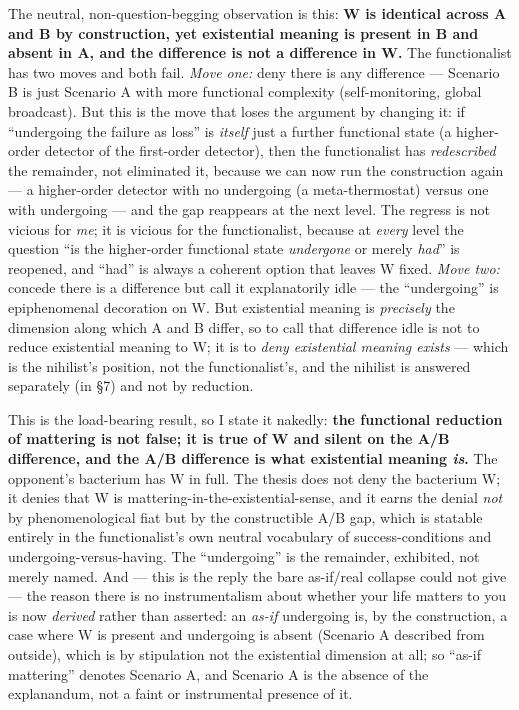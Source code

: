 \documentclass[11pt]{article}
\begin{document}
The neutral, non-question-begging observation is this: \textbf{W is identical across A and B by construction, yet existential meaning is present in B and absent in A, and the difference is not a difference in W.} The functionalist has two moves and both fail. \emph{Move one:} deny there is any difference — Scenario B is just Scenario A with more functional complexity (self-monitoring, global broadcast). But this is the move that loses the argument by changing it: if ``undergoing the failure as loss'' is \emph{itself} just a further functional state (a higher-order detector of the first-order detector), then the functionalist has \emph{redescribed} the remainder, not eliminated it, because we can now run the construction again — a higher-order detector with no undergoing (a meta-thermostat) versus one with undergoing — and the gap reappears at the next level. The regress is not vicious for \emph{me}; it is vicious for the functionalist, because at \emph{every} level the question ``is the higher-order functional state \emph{undergone} or merely \emph{had}'' is reopened, and ``had'' is always a coherent option that leaves W fixed. \emph{Move two:} concede there is a difference but call it explanatorily idle — the ``undergoing'' is epiphenomenal decoration on W. But existential meaning is \emph{precisely} the dimension along which A and B differ, so to call that difference idle is not to reduce existential meaning to W; it is to \emph{deny existential meaning exists} — which is the nihilist's position, not the functionalist's, and the nihilist is answered separately (in §7) and not by reduction.

This is the load-bearing result, so I state it nakedly: \textbf{the functional reduction of mattering is not false; it is true of W and silent on the A/\allowbreak{}B difference, and the A/\allowbreak{}B difference is what existential meaning \emph{is}.} The opponent's bacterium has W in full. The thesis does not deny the bacterium W; it denies that W is mattering-in-the-existential-sense, and it earns the denial \emph{not} by phenomenological fiat but by the constructible A/\allowbreak{}B gap, which is statable entirely in the functionalist's own neutral vocabulary of success-conditions and undergoing-versus-having. The ``undergoing'' is the remainder, exhibited, not merely named. And — this is the reply the bare as-if/\allowbreak{}real collapse could not give — the reason there is no instrumentalism about whether your life matters to you is now \emph{derived} rather than asserted: an \emph{as-if} undergoing is, by the construction, a case where W is present and undergoing is absent (Scenario A described from outside), which is by stipulation not the existential dimension at all; so ``as-if mattering'' denotes Scenario A, and Scenario A is the absence of the explanandum, not a faint or instrumental presence of it.
\end{document}
